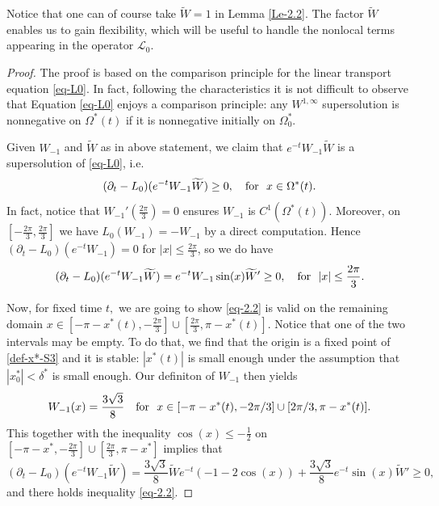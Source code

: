 \documentclass[12pt]{amsart}
\numberwithin{equation}{section}
\numberwithin{equation}{section}
\begin{document}
 {Notice that one can of course take $\widetilde W=1$ in Lemma \ref{Le-2.2}. The factor $\widetilde W$ enables us to gain flexibility, which will be useful to handle the nonlocal terms appearing in the operator $\mathcal L_0$.}
 
 
  \begin{proof}
  The proof is based on the  comparison principle for the linear transport equation \eqref{eq-L0}.   In fact,   following the characteristics  it is not difficult to observe that Equation  \eqref{eq-L0} enjoys a comparison principle:  any $W^{1, \infty}$ supersolution  is nonnegative on $\Omega^*(t)$  if it is  nonnegative initially on $\Omega^*_0.$ 
  
   Given  $W_{-1}$ and  $\widetilde W$ as in above statement,   we claim that  $e^{-t}W_{-1}\widetilde W$ is a supersolution of \eqref{eq-L0},  i.e.
  \begin{equation}\label{eq-2.2} 
(\partial_t -L_0)(e^{-t}W_{-1}\widetilde W)\geq 0,\quad {\rm for} ~~ x\in  \Omega^*(t).
  \end{equation}
   In fact,  notice  that $W_{-1}'(\frac{2\pi}{3})=0$ ensures $W_{-1}$ is $C^1(\Omega^*(t))$. Moreover, on $[-\frac{2\pi}{3},\frac{2\pi}{3}]$ we have $L_0(W_{-1})=-W_{-1}$ by a direct computation. Hence $ (\partial_t -L_0)(e^{-t}W_{-1})=0$ for $|x|\leq \frac{2\pi}{3}$,  so we  do have
       \begin{equation*} (\partial_t -L_0)(e^{-t}W_{-1}\widetilde W)=    e^{-t}W_{-1}\sin (x)\widetilde W'\geq 0,\quad {\rm for} ~~|x|\leq \frac{2\pi}{3}.
 \end{equation*}
 
Now,    for fixed time $t,$  we are going to  show \eqref{eq-2.2} is valid  on the remaining domain  $x\in [-\pi-x^*(t), -\frac{2\pi}{3}]\cup [\frac{2\pi}{3}, \pi-x^*(t)].$   {Notice that one of the two intervals may be empty.}   
To do that,  we find that the origin is a fixed point of  \eqref{def-x*-S3} and it is stable:    $|x^*(t)|$ is small enough  under the assumption that  $|x^*_0|<\delta^*$ is small enough.
Our definiton of $W_{-1}$ then yields 
 \begin{equation*}
{W}_{-1} (x)=
\frac{3\sqrt{3}}{8}\quad {\rm for} ~~ x\in [-\pi-x^*(t), - {2\pi}/{3}]\cup [{2\pi}/{3}, \pi-x^*(t)].
\end{equation*}
This together with the inequality  $\cos(x)\leq -\frac{1}{2}$ on $[-\pi-x^*, -\frac{2\pi}{3}]\cup [\frac{2\pi}{3}, \pi-x^*]$ implies that 
 \begin{equation*} (\partial_t -L_0)(e^{-t}W_{-1}\widetilde W)=   \frac{3\sqrt{3}}{8}\widetilde We^{-t} \left(-1-2\cos(x)\right)   +\frac{3\sqrt{3}}{8}e^{-t} \sin(x)    \widetilde W'\geq 0,
 \end{equation*}
and there holds inequality \eqref{eq-2.2}.
\medskip
 


\end{proof}
\end{document}
